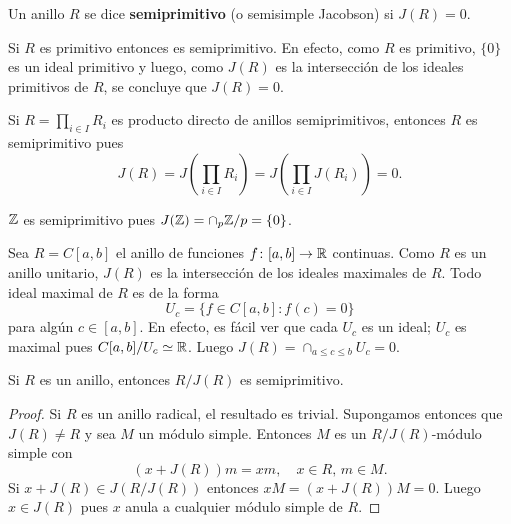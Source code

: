 
\begin{definition}
	Un anillo $R$ se dice \textbf{semiprimitivo} (o semisimple Jacobson) si
	$J(R)=0$.
\end{definition}

\begin{example}
	Si $R$ es primitivo entonces es semiprimitivo. En efecto, como $R$ es
	primitivo, $\{0\}$ es un ideal primitivo y luego, como $J(R)$ es la
	intersección de los ideales primitivos de $R$, se concluye que $J(R)=0$.
\end{example}

\begin{example}
	Si $R=\prod_{i\in I}R_i$ es producto directo de anillos semiprimitivos,
	entonces $R$ es semiprimitivo pues 
	\[
		J(R)=J\left(\prod_{i\in I}R_i\right)=J\left(\prod_{i\in I}J(R_i)\right)=0.
	\]
\end{example}

\begin{example}
	$\mathbb{Z}$ es semiprimitivo pues $J(\mathbb{Z})=\cap_{p}\mathbb{Z}/p=\{0\}$.
\end{example}

\begin{example}
	Sea $R=C[a,b]$ el anillo de funciones $f\colon [a,b]\to\mathbb{R}$ continuas. Como
	$R$ es un anillo unitario, $J(R)$ es la intersección de los ideales
	maximales de $R$. Todo ideal maximal de $R$ es de la forma
	\[
		U_c=\{f\in C[a,b]:f(c)=0\}
	\]
	para algún $c\in[a,b]$. En efecto, es fácil ver que cada $U_c$ es un ideal;
	$U_c$ es maximal pues $C[a,b]/U_c\simeq\mathbb{R}$.  Luego $J(R)=\cap_{a\leq c\leq
	b}U_c=0$.
\end{example}

\begin{theorem}
	\label{thm:semiprimitivo}
	Si $R$ es un anillo, entonces $R/J(R)$ es semiprimitivo. 
\end{theorem}

\begin{proof}
	Si $R$ es un anillo radical, el resultado es trivial. Supongamos entonces
	que $J(R)\ne R$ y sea $M$ un módulo simple. Entonces $M$ es un
	$R/J(R)$-módulo simple con
	\[
		(x+J(R))m=xm,\quad
		x\in R,\,m\in M.
	\]
	Si $x+J(R)\in J(R/J(R))$ entonces $xM=(x+J(R))M=0$. Luego $x\in J(R)$ pues
	$x$ anula a cualquier módulo simple de $R$.
\end{proof}

%
%


